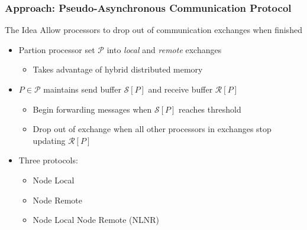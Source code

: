 \documentclass{beamer}
\begin{document}

\begin{frame}
\frametitle{Approach: Pseudo-Asynchronous Communication Protocol}

\begin{block}{The Idea}
Allow processors to drop out of communication exchanges when finished
\end{block}

\begin{itemize}
	\item Partion processor set $\mathcal{P}$ into \emph{local} and \emph{remote} exchanges
	\begin{itemize}
		\item Takes advantage of hybrid distributed memory
	\end{itemize}
	\item $P \in \mathcal{P}$ maintains send buffer $\mathcal{S}[P]$ and receive buffer $\mathcal{R}[P]$ 
	\begin{itemize}
		\item Begin forwarding messages when $\mathcal{S}[P]$ reaches threshold
		\item Drop out of exchange when all other processors in exchanges stop updating $\mathcal{R}[P]$
	\end{itemize}
	\item Three protocols:
	\begin{itemize}
		\item Node Local
		\item Node Remote
		\item Node Local Node Remote (NLNR)
	\end{itemize}
\end{itemize}

\end{frame}

\end{document}
